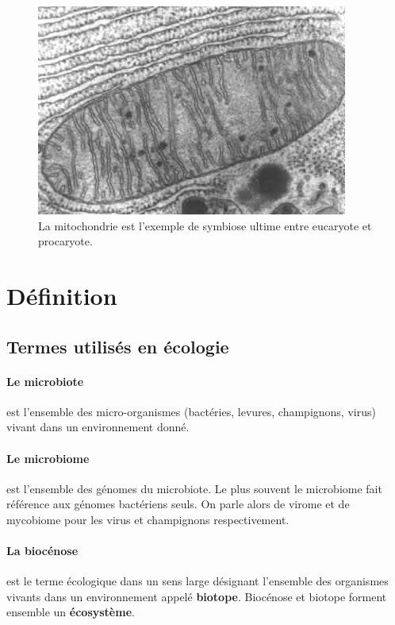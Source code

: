 \documentclass[12pt,a4paper]{article}
\begin{document}
\begin{figure}[ht]
\begin{center}
\includegraphics[scale=0.5]{img/mitochondrie.jpg}\hfill
\end{center}
\caption{La mitochondrie est l'exemple de symbiose ultime entre eucaryote et procaryote.}
\label{mitochondrie}
\end{figure}



\newpage

\section{Définition}
\subsection{Termes utilisés en écologie}

\paragraph{Le microbiote\cite{Eisen}} est l’ensemble des micro-organismes (bactéries, levures, champignons, virus) vivant dans un environnement donné.
\paragraph{Le microbiome\cite{Eisen}} est l'ensemble des génomes du microbiote. Le plus souvent le microbiome fait référence aux génomes bactériens seuls. On parle alors de virome et de mycobiome pour les virus et champignons respectivement.

\paragraph{La biocénose} est le terme écologique dans un sens large désignant l'ensemble des organismes vivants dans un environnement appelé \textbf{biotope}. Biocénose et biotope forment ensemble un \textbf{écosystème}.
\end{document}
